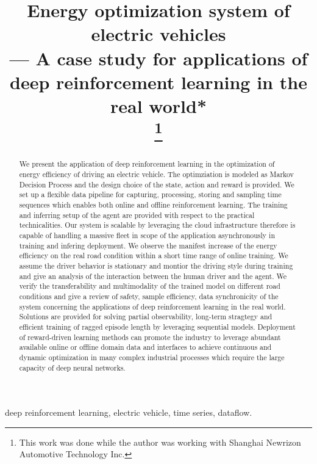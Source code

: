 \documentclass[conference]{IEEEtran}
\title{Energy optimization system of electric vehicles \\--- A case study for applications of deep reinforcement learning in the real world*\\
\thanks{This work was done while the author was working with Shanghai Newrizon Automotive Technology Inc.}
}
\begin{document}
\author{
}


\maketitle

\begin{abstract}
	We present the application of deep reinforcement learning in the optimization of energy efficiency of driving an electric vehicle. The optimziation is modeled as Markov Decision Process and the design choice of the state, action and reward is provided. We set up a flexible data pipeline for capturing, processing, storing and sampling time sequences which enables both online and offline reinforcement learning. The training and inferring setup of the agent are provided with respect to the practical technicalities. Our system is scalable by leveraging the cloud infrastructure therefore is capable of handling a massive fleet in scope of the application asynchronously in training and infering deployment. We observe the manifest increase of the energy efficiency on the real road condition within a short time range of online training. We assume the driver behavior is stationary and montior the driving style during training and give an analysis of the interaction between the human driver and the agent. We verify the transferability and multimodality of the trained model on different road conditions and give a review of safety, sample efficiency, data synchronicity of the system concerning the applications of deep reinforcement learning in the real world. Solutions are provided for solving partial observability, long-term stragtegy and efficient training of ragged episode length by leveraging sequential models. Deployment of reward-driven learning methods can promote the industry to leverage abundant available online or offline domain data and interfaces to achieve continuous and dynamic optimization in many complex industrial processes which require the large capacity of deep neural networks.
\end{abstract}

\begin{IEEEkeywords}
deep reinforcement learning, electric vehicle, time series, dataflow.
\end{IEEEkeywords}
\end{document}
